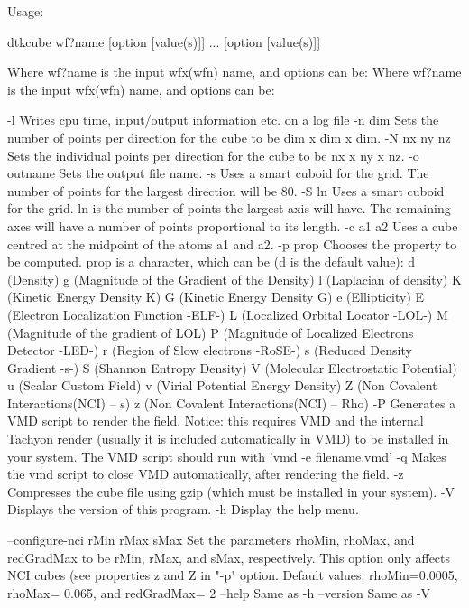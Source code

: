 Usage:

	dtkcube wf?name [option [value(s)]] ... [option [value(s)]]

Where wf?name is the input wfx(wfn) name, and options can be:
Where wf?name is the input wfx(wfn) name, and options can be:

  -l        	Writes cpu time, input/output information etc. on a log file
  -n  dim   	Sets the number of points per direction for the cube
            	  to be dim x dim x dim.
  -N nx ny nz	Sets the individual points per direction for the cube
            	  to be nx x ny x nz.
  -o outname	Sets the output file name.
  -s        	Uses a smart cuboid for the grid. The number of points for the
            	  largest direction will be 80.
  -S ln     	Uses a smart cuboid for the grid. ln is the number of points
            	  the largest axis will have. The remaining axes will have
            	  a number of points proportional to its length.
  -c a1 a2  	Uses a cube centred at the midpoint of the atoms a1 and a2.
  -p prop	Chooses the property to be computed. prop is a character,
         	  which can be (d is the default value): 
         		d (Density)
         		g (Magnitude of the Gradient of the Density)
         		l (Laplacian of density)
         		K (Kinetic Energy Density K)
         		G (Kinetic Energy Density G)
         		e (Ellipticity)
         		E (Electron Localization Function -ELF-)
         		L (Localized Orbital Locator -LOL-)
         		M (Magnitude of the gradient of LOL)
         		P (Magnitude of Localized Electrons Detector -LED-)
         		r (Region of Slow electrons -RoSE-)
         		s (Reduced Density Gradient -s-)
         		S (Shannon Entropy Density)
         		V (Molecular Electrostatic Potential)
         		u (Scalar Custom Field)
         		v (Virial Potential Energy Density)
         		Z (Non Covalent Interactions(NCI) -- s)
         		z (Non Covalent Interactions(NCI) -- Rho)
  -P     	Generates a VMD script to render the field. Notice: this requires VMD and the internal
         	  Tachyon render (usually it is included automatically in VMD) to be installed
         	  in your system. The VMD script should run with 'vmd -e filename.vmd'
  -q     	Makes the vmd script to close VMD automatically, after rendering the field.
  -z     	Compresses the cube file using gzip (which must be installed
         	   in your system).
  -V        	Displays the version of this program.
  -h		Display the help menu.

  --configure-nci rMin rMax sMax 	Set the parameters rhoMin, rhoMax,
             		  and redGradMax to be rMin, rMax, and sMax, respectively.
             		  This option only affects NCI cubes (see properties z and
             		  Z in "-p" option. Default values: rhoMin=0.0005,
             		  rhoMax= 0.065, and redGradMax= 2
  --help    		Same as -h
  --version 		Same as -V
